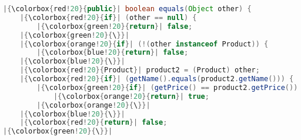  \begin{lstlisting}[language=Java]
|{\colorbox{red!20}{public}| boolean equals(Object other) {
    |{\colorbox{red!20}{if}| (other == null) {
        |{\colorbox{green!20}{return}| false;
    |{\colorbox{green!20}{\}}|
    |{\colorbox{orange!20}{if}| (!(other instanceof Product)) {
        |{\colorbox{blue!20}{return}| false;
    |{\colorbox{blue!20}{\}}|
    |{\colorbox{red!20}{Product}| product2 = (Product) other;
    |{\colorbox{red!20}{if}| (getName().equals(product2.getName())) {
        |{\colorbox{green!20}{if}| (getPrice() == product2.getPrice()) {
            |{\colorbox{orange!20}{return}| true;
        |{\colorbox{orange!20}{\}}|
    |{\colorbox{blue!20}{\}}|
    |{\colorbox{red!20}{return}| false;
|{\colorbox{green!20}{\}}|
\end{lstlisting}
